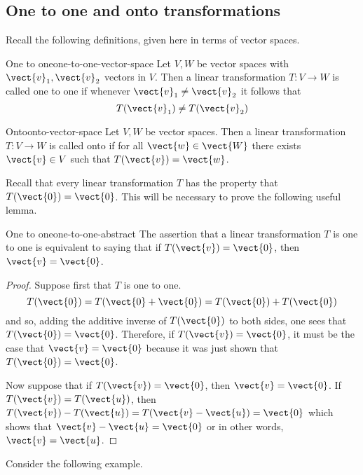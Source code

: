\subsection{One to one and onto transformations}

Recall the following definitions, given here in terms of vector spaces.

\begin{definition}{One to one}{one-to-one-vector-space}
Let $V, W$ be vector spaces with $\vect{v}_1, \vect{v}_2$ vectors in $V$. Then a linear transformation $T: V \to W$ is called one to one if whenever $\vect{v}_1 \neq \vect{v}_2$ it follows that
\[
T(\vect{v}_1) \neq T (\vect{v}_2)
\]
\end{definition}

\begin{definition}{Onto}{onto-vector-space}
Let $V, W$ be vector spaces. Then a linear transformation $T: V \to W$ is called onto if for all $\vect{w} \in \vect{W}$ there exists $\vect{v} \in V$ such that $T(\vect{v}) = \vect{w}$.
\end{definition}

Recall that every linear transformation $T$ has the property that $T(\vect{0})=\vect{0}$. This will be necessary to prove the following useful lemma.

\begin{lemma}{One to one}{one-to-one-abstract}
The assertion that a linear transformation $T$ is one to one is equivalent to
saying that if $T(\vect{v})=\vect{0}$, then $\vect{v}=\vect{0}$.
\end{lemma}

\begin{proof}
Suppose first that $T$ is one to one.
\begin{equation*}
T(\vect{0})=T(\vect{0}+\vect{0}) =T(\vect{0})+T(\vect{0})
\end{equation*}
and so, adding the additive inverse of $T(\vect{0})$ to both sides, one sees
that $T(\vect{0})=\vect{0}$. Therefore, if $T(\vect{v})=\vect{0}$, it must be the
case that $\vect{v}=\vect{0}$ because it was just shown that $T(\vect{0})=\vect{0}$.

Now suppose that if $T(\vect{v})=\vect{0}$, then $\vect{v}=\vect{0}$. If $T(\vect{v})=T(\vect{u})$, then $T(\vect{v})-T(\vect{u})=T(\vect{v}-\vect{u}) =\vect{0}$ which
shows that $\vect{v}-\vect{u}=\vect{0}$ or in other words, $\vect{v}=\vect{u}$.
\end{proof}

Consider the following example.

